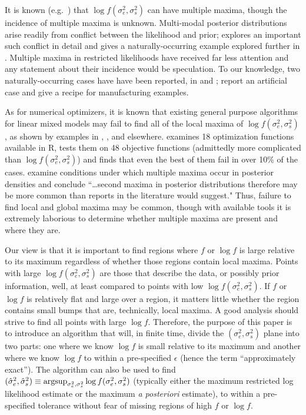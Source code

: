 \documentclass{report}
\newcommand{\textcompute}{\textsf}
\newcommand{\R}{\textcompute{R}\xspace}
\newcommand{\RL}{f}
\newcommand{\logRL}{\log\RL}
\newcommand{\sigssq}{\sigma_s^2}
\newcommand{\sigesq}{\sigma_e^2}
\newcommand{\sshat}{\hat\sigma^2_e,\hat\sigma^2_s}
\newcommand{\logRLss}{\logRL(\sigesq,\sigssq)}
\newcommand{\argsup}{\operatornamewithlimits{argsup}}
\begin{document}
It is known (e.g.\ \citealt{henn&hodges:2014}) that $\logRLss$
can have multiple maxima,
though the incidence of multiple maxima is unknown.  Multi-modal posterior distributions arise readily from conflict between the likelihood and prior;  \cite{Liu&Hodges:2003} explores an important such conflict in detail and \cite{wakefield:1998} gives a naturally-occurring example explored further in \cite{henn&hodges:2014}.  Multiple maxima in restricted likelihoods have received far less attention and any statement about their incidence would be speculation.  To our knowledge, two naturally-occurring cases have have been reported, in \cite{welham_thompson:2009} and \cite{reiss_etal:2014};  \cite{henn&hodges:2014} report an artificial case and give a recipe for manufacturing examples.  

As for numerical optimizers, it is known that existing general purpose algorithms for linear mixed models may fail to find all of the local maxima of $\logRLss$, as shown by examples in \cite{hodges:2013}, \cite{henn&hodges:2014}, and elsewhere.  \cite{mullen:2014} examines 18 optimization functions available in \R, tests them on 48 objective functions (admittedly more complicated than $\logRLss$) and finds that even the best of them fail in over 10\% of the cases.  \cite{henn&hodges:2014} examine conditions under which multiple maxima occur in posterior densities and conclude ``\dots second maxima in posterior distributions therefore may be more common than reports in the literature would suggest."  Thus, failure to find local and global maxima may be common, though with available tools it is extremely laborious to determine whether multiple maxima are present and where they are.

Our view is that it is important to find regions where $f$ or $\log f$ is large relative to its maximum regardless of whether those regions contain local maxima.  Points with large $\logRLss$ are those that describe the data, or possibly  prior information, well, at least compared to points with low $\logRLss$.  If $f$ or $\log f$ is relatively flat and large over a region, it matters little whether the region contains small bumps that are, technically, local maxima.  A good analysis should strive to find all  points with large $\logRL$.  Therefore, the purpose of this paper is to introduce an algorithm that will, in finite time, divide the $(\sigesq,\sigssq)$ plane into two parts: one where we know $\logRL$ is small relative to its maximum and another where we know $\logRL$ to within a pre-specified $\epsilon$ (hence the term ``approximately exact'').  The algorithm can also be used to find $(\sshat) \equiv \argsup_{\sigesq, \sigssq}\logRLss$  (typically either the maximum restricted log likelihood estimate or the maximum \textit{a posteriori} estimate), to within a pre-specified tolerance without fear of missing regions of high $f$ or $\logRL$.
\end{document}

